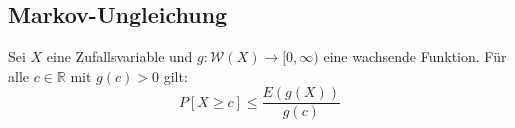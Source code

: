 \documentclass[a4paper,titlepage]{article}
\begin{document}
\subsection{Markov-Ungleichung}
Sei $X$ eine Zufallsvariable und $g: \mathcal{W}(X) \to [0,\infty)$ eine wachsende Funktion. Für alle $c \in \mathbb{R}$ mit $g(c) > 0$ gilt:
\begin{equation*}
P[X \geq c] \leq \frac{E(g(X))}{g(c)}
\end{equation*}                                                                                                                                                                                                                                                                                                                                                                                                                                                                                                                                                                                                                                                                                                                                                                                                                                                                                                                                                                                                                                                                                                                                                                                                                                                                                                                                                                                                                                                                                                                                                                                                                                                                                                                                                                                                                                                                                                                                                                                                                                                                                                                                                                                                                                                                                                                                                                                                                                                                                                                                                                                                                                                                                                                                                                                                   
\end{document}
